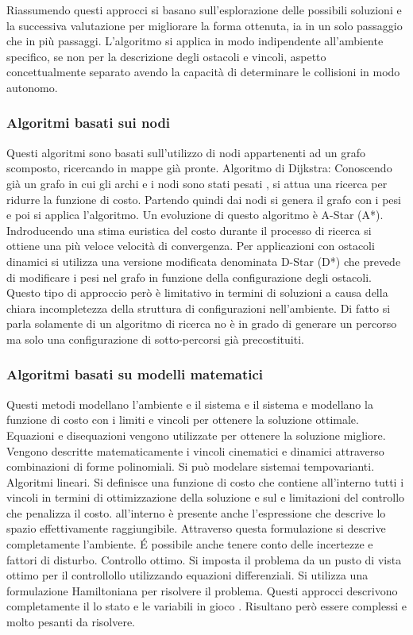 Riassumendo questi approcci si basano sull'esplorazione delle possibili soluzioni e la successiva valutazione per migliorare la forma ottenuta, ia in un solo passaggio che in più passaggi. L'algoritmo si applica in modo indipendente all'ambiente specifico, se non per la descrizione degli ostacoli e vincoli, aspetto concettualmente separato avendo la capacità di determinare le collisioni in modo autonomo.


\subsubsection{Algoritmi basati sui nodi}
Questi algoritmi sono basati sull'utilizzo di nodi appartenenti ad un grafo scomposto, ricercando in mappe già pronte.
Algoritmo di Dijkstra: Conoscendo già un grafo in cui gli archi e i nodi sono stati pesati , si attua una ricerca per ridurre la funzione di costo. Partendo quindi dai nodi si genera il grafo con i pesi e poi si applica l'algoritmo. Un evoluzione di questo algoritmo è A-Star (A*). Indroducendo una stima euristica del costo durante il processo di ricerca si ottiene una più veloce velocità di convergenza. Per applicazioni con ostacoli dinamici si utilizza una versione modificata denominata D-Star (D*) che prevede di modificare i pesi nel grafo in funzione della configurazione degli ostacoli. Questo tipo di approccio però è limitativo in termini di soluzioni a causa della chiara incompletezza della struttura di configurazioni nell'ambiente. Di fatto si parla solamente di un algoritmo di ricerca no è in grado di generare un percorso ma solo una configurazione di sotto-percorsi già precostituiti.

\subsubsection{Algoritmi basati su modelli matematici}
Questi metodi modellano l'ambiente  e il sistema e il sistema e modellano la funzione di costo con i limiti e vincoli per ottenere la soluzione ottimale. Equazioni e disequazioni vengono utilizzate per ottenere la soluzione migliore.
Vengono descritte matematicamente i vincoli cinematici e dinamici attraverso combinazioni di forme polinomiali. Si può modelare sistemai tempovarianti. 
Algoritmi lineari. Si definisce una funzione di costo che contiene all'interno tutti i vincoli in termini di ottimizzazione della soluzione e sul e limitazioni del controllo che penalizza il costo. all'interno è presente anche l'espressione che descrive lo spazio effettivamente raggiungibile. Attraverso questa formulazione si descrive completamente l'ambiente. \'E possibile anche tenere conto delle incertezze e fattori di disturbo.
Controllo ottimo. Si imposta il problema da un pusto di vista ottimo per il controllollo utilizzando equazioni differenziali. Si utilizza una formulazione Hamiltoniana per risolvere il problema. 
Questi approcci descrivono completamente il lo stato e le variabili in gioco . Risultano però essere complessi e molto pesanti da risolvere.

